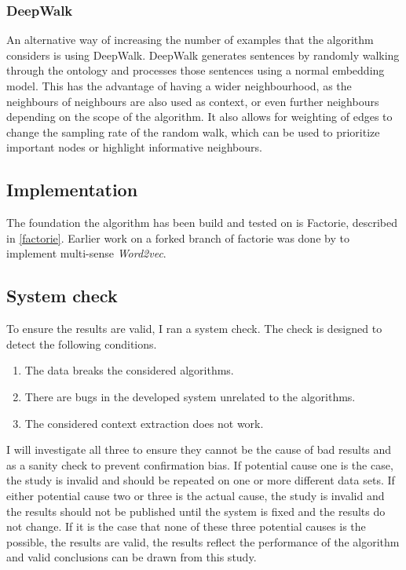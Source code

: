 \documentclass{article}
\begin{document}
 \subsubsection{DeepWalk}
  An alternative way of increasing the number of examples that the algorithm considers is using DeepWalk. DeepWalk generates sentences by randomly walking through the ontology and processes those sentences using a normal embedding model. This has the advantage of having a wider neighbourhood, as the neighbours of neighbours are also used as context, or even further neighbours depending on the scope of the algorithm. It also allows for weighting of edges to change the sampling rate of the random walk, which can be used to prioritize important nodes or highlight informative neighbours.

 \subsection{Implementation}
 The foundation the algorithm has been build and tested on is Factorie, described in \ref{factorie}. Earlier work on a forked branch of factorie was done by \cite{multisensecode} to implement multi-sense \emph{Word2vec}.
 
 
 \subsection{System check}
 To ensure the results are valid, I ran a system check. The check is designed to detect the following conditions.
  \begin{enumerate}
  \item The data breaks the considered algorithms.
  \item There are bugs in the developed system unrelated to the algorithms.
  \item The considered context extraction does not work.
  \end{enumerate}
  
  I will investigate all three to ensure they cannot be the cause of bad results and as a sanity check to prevent confirmation bias.
  If potential cause one is the case, the study is invalid and should be repeated on one or more different data sets. If either potential cause two or three is the actual cause, the study is invalid and the results should not be published until the system is fixed and the results do not change. If it is the case that none of these three potential causes is the possible, the results are valid, the results reflect the performance of the algorithm and valid conclusions can be drawn from this study.
  
\end{document}
